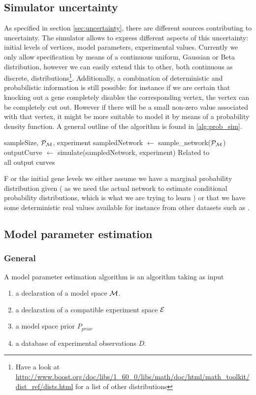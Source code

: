 \documentclass{article}
\begin{document}
\subsection{Simulator uncertainty}
As specified in section \ref{sec:uncertainty}, there are different sources contributing to uncertainty. The simulator allows to express different aspects of this uncertainty: initial levels of vertices, model parameters, experimental values.
Currently we only allow specification by means of a continuous uniform, Gaussian or Beta distribution, however we can easily extend this to other, both continuous as discrete, distributions\footnote{Have a look at \url{http://www.boost.org/doc/libs/1_60_0/libs/math/doc/html/math_toolkit/dist_ref/dists.html}
for a list of other distributions}.	
Additionally, a combination of deterministic and probabilistic information is still possible: for instance if we are certain that knocking out a gene completely disables the corresponding vertex, the vertex can be completely cut out. However if there will be
a small non-zero value associated with that vertex, it might be more suitable to model it by means of a probability density function. A general outline of the algorithm is found in \ref{alg:prob_sim}.
\begin{algorithmic}\label{alg:prob_sim}
  \Require sampleSize, $\mathcal{P}_\mathcal{M}$, experiment
  \State sampledNetwork $\leftarrow$ sample\_network($\mathcal{P}_\mathcal{M}$)
  \State outputCurve $\leftarrow$  simulate(sampledNetwork, experiment) \Comment Related to \label{sec:param_sim}
  \EndFor \\
  \Return all output curves 
  
  \EndFunction 
\end{algorithmic} 
F	or the initial gene levels we either assume we have a 
marginal probability distribution given ( as we need the actual network to estimate conditional probability distributions, which is what we are trying to learn ) or that we have some deterministic real values available for instance from other 
datasets such as \cite{brauer2008coordination}. 

\subsection{Model parameter estimation}
\subsubsection{General}
A model parameter estimation algorithm is an algorithm taking as input
\begin{enumerate}
\item a declaration of a model space $\mathcal{M}$.
\item a declaration of a compatible experiment space $\mathcal{E}$
\item a model space prior $P_{prior}$
\item a database of experimental observations $D$.
\end{enumerate}
\end{document}
